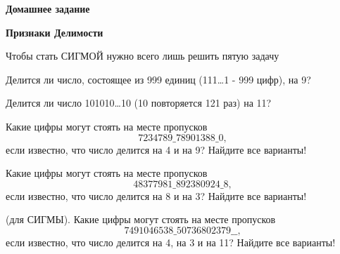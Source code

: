 \hspace{3mm}

\centerline{\bf \Huge Домашнее задание}
\centerline{\bf \Huge Признаки Делимости}

\begin{flushright}
    \scriptsize{Чтобы стать СИГМОЙ нужно всего лишь решить пятую задачу}
\end{flushright}

 Делится ли число, состоящее из 999 единиц (111\ldots1 - 999 цифр), на 9?

 Делится ли число 101010\ldots10 (10 повторяется 121 раз) на 11?

 Какие цифры могут стоять на месте пропусков \[7234789\_78901388\_0,\] если известно, что число делится на 4 и на 9? Найдите все варианты!

 Какие цифры могут стоять на месте пропусков \[48377981\_892380924\_8,\] если известно, что число делится на 8 и на 3? Найдите все варианты!

 (для СИГМЫ). Какие цифры могут стоять на месте пропусков
\[7491046538\_50736802379\_ \_,\]
если известно, что число делится на 4, на 3 и на 11? Найдите все варианты!